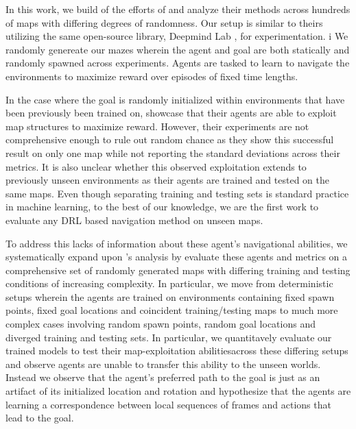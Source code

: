 
In this work, we build of the efforts of \cite{MiPaViICLR2017} and analyze their methods across hundreds of maps with differing degrees of randomness. 
Our setup is similar to theirs utilizing the same open-source library, Deepmind Lab \cite{BeLeTeARXIV2016}, for experimentation. i
We randomly genereate our mazes wherein the agent and goal are both statically and randomly spawned across experiments. 
Agents are tasked to learn to navigate the environments to maximize reward over episodes of fixed time lengths.

In the case where the goal is randomly initialized within environments that have been previously been trained on, \cite{MiPaViICLR2017} showcase that their agents are able to exploit map structures to maximize reward. However, their experiments are not comprehensive enough to rule out random chance as they show this successful result on only one map while not reporting the standard deviations across their metrics. It is also unclear whether this observed exploitation extends to previously unseen environments as their agents are trained and tested on the same maps. Even though separating training and testing sets is standard practice in machine learning, to the best of our knowledge, we are the first work to evaluate any DRL based navigation method on unseen maps. 

To address this lacks of information about these agent's navigational abilities, we systematically expand upon \cite{MiPaViICLR2017}'s analysis by evaluate these agents and  metrics on a comprehensive set of randomly generated maps with differing training and testing conditions of increasing complexity. 
In particular, we move from deterministic setups wherein the agents are trained on environments containing fixed spawn points, fixed goal locations and coincident training/testing maps to  much more complex cases involving random spawn points, random goal locations and diverged training and testing sets. 
In particular, we quantitavely evaluate our trained models to test their map-exploitation abilitiesacross these differing setups and observe agents are unable to transfer this ability to the unseen worlds. Instead we observe that the agent's preferred path to the goal is just as an artifact of its initialized location and rotation and hypothesize that the agents are learning a correspondence between local sequences of frames and actions that lead to the goal.

